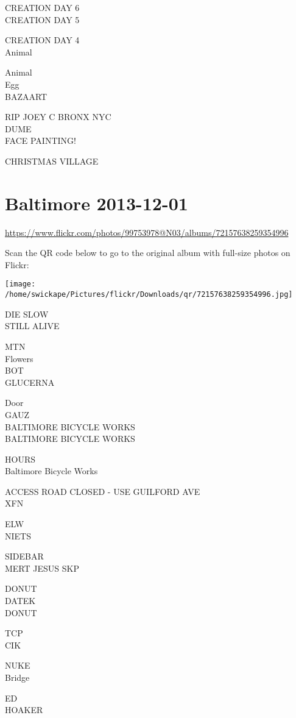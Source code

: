 \documentclass[10pt,letterpaper]{article}
\begin{document}
CREATION DAY 6\\
CREATION DAY 5

CREATION DAY 4\\
Animal

Animal\\
Egg\\
BAZAART

RIP JOEY C BRONX NYC\\
DUME\\
FACE PAINTING!

CHRISTMAS VILLAGE
\pagebreak

\section*{Baltimore 2013-12-01}

\url{https://www.flickr.com/photos/99753978@N03/albums/72157638259354996}

Scan the QR code below to go to the original album with full-size photos on Flickr:

\texttt{[image: /home/swickape/Pictures/flickr/Downloads/qr/72157638259354996.jpg]}
\pagebreak

DIE SLOW\\
STILL ALIVE

MTN\\
Flowers\\
BOT\\
GLUCERNA

Door\\
GAUZ\\
BALTIMORE BICYCLE WORKS\\
BALTIMORE BICYCLE WORKS

HOURS\\
Baltimore Bicycle Works

ACCESS ROAD CLOSED {-} USE GUILFORD AVE\\
XFN

ELW\\
NIETS

SIDEBAR\\
MERT JESUS SKP

DONUT\\
DATEK\\
DONUT

TCP\\
CIK

NUKE\\
Bridge

ED\\
HOAKER
\end{document}
